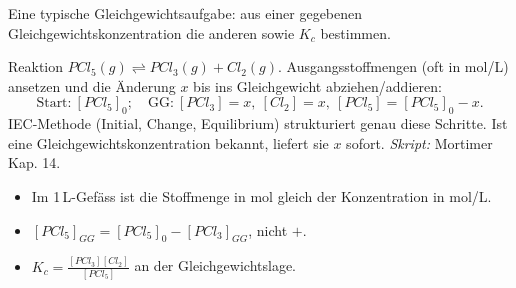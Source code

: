 

Eine typische Gleichgewichtsaufgabe: aus einer gegebenen
Gleichgewichtskonzentration die anderen sowie $K_c$ bestimmen.

\begin{werkzeugkasten}[Gleichgewichtsrechnung]
Reaktion $PCl_5(g) \rightleftharpoons PCl_3(g) + Cl_2(g)$.
Ausgangsstoffmengen (oft in mol/L) ansetzen und die Änderung $x$ bis ins
Gleichgewicht abziehen/addieren:
\[
  \text{Start:}\ [PCl_5]_0;\quad
  \text{GG:}\ [PCl_3]=x,\ [Cl_2]=x,\ [PCl_5]=[PCl_5]_0-x .
\]
IEC-Methode (Initial, Change, Equilibrium) strukturiert genau diese
Schritte. Ist eine Gleichgewichtskonzentration bekannt, liefert sie $x$ sofort.
\textit{Skript:} Mortimer Kap. 14.
\end{werkzeugkasten}

\begin{achtung}
\begin{itemize}
  \item Im 1\,L-Gefäss ist die Stoffmenge in mol gleich der Konzentration in
        mol/L.
  \item $[PCl_5]_{GG} = [PCl_5]_0 - [PCl_3]_{GG}$, nicht $+$.
  \item $K_c = \frac{[PCl_3][Cl_2]}{[PCl_5]}$ an der Gleichgewichtslage.
\end{itemize}
\end{achtung}
